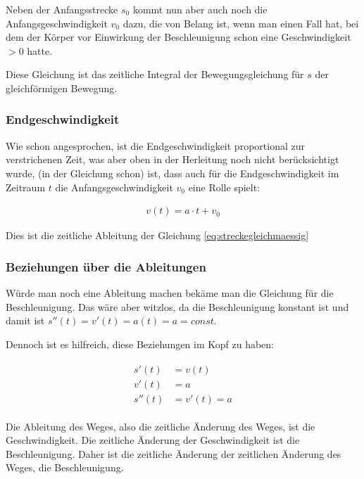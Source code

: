\noindent Neben der Anfangsstrecke $s_0$ kommt nun aber auch noch die Anfangsgeschwindigkeit $v_0$ dazu, die von Belang ist, wenn man einen Fall hat, bei dem der Körper vor Einwirkung der Beschleunigung schon eine Geschwindigkeit $>0$ hatte.

\begin{NiceToKnow}
	Diese Gleichung ist das zeitliche Integral der Bewegungsgleichung für $s$ der gleichförmigen Bewegung.
\end{NiceToKnow}


\subsubsection{Endgeschwindigkeit}

Wie schon angesprochen, ist die Endgeschwindigkeit proportional zur verstrichenen Zeit, was aber oben in der Herleitung noch nicht berücksichtigt wurde, (in der Gleichung schon) ist, dass auch für die Endgeschwindigkeit im Zeitraum $t$ die Anfangsgeschwindigkeit $v_0$ eine Rolle spielt:

\begin{align}	\label{eq:geschwindigkeitgleichmaessig}
	v(t) = a \cdot t + v_0
\end{align}

\noindent Dies ist die zeitliche Ableitung der Gleichung \ref{eq:streckegleichmaessig}


\subsubsection{Beziehungen über die Ableitungen}

Würde man noch eine Ableitung machen bekäme man die Gleichung für die Beschleunigung. Das wäre aber witzlos, da die Beschleunigung konstant ist und damit ist $s''(t)=v'(t)=a(t)=a= const$.

Dennoch ist es hilfreich, diese Beziehungen im Kopf zu haben:

\begin{align}
\begin{split}
	s'(t) &= v(t) \\
	v'(t) &= a \\
	s''(t) &= v'(t)= a
\end{split}
\end{align}

\noindent Die Ableitung des Weges, also die zeitliche Änderung des Weges, ist die Geschwindigkeit. Die zeitliche Änderung der Geschwindigkeit ist die Beschleunigung. Daher ist die zeitliche Änderung der zeitlichen Änderung des Weges, die Beschleunigung.



